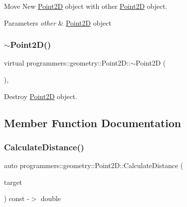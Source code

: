 Move New \hyperlink{classprogrammers_1_1geometry_1_1Point2D}{Point2D} object with other \hyperlink{classprogrammers_1_1geometry_1_1Point2D}{Point2D} object. 


\begin{DoxyParams}{Parameters}
{\em other} & \hyperlink{classprogrammers_1_1geometry_1_1Point2D}{Point2D} object \\
\hline
\end{DoxyParams}
\mbox{\label{classprogrammers_1_1geometry_1_1Point2D_a61f13d98978ddb65c4380657fb429cb3}} 
\subsubsection{\texorpdfstring{$\sim$\+Point2\+D()}{~Point2D()}}
{\footnotesize\ttfamily virtual programmers\+::geometry\+::\+Point2\+D\+::$\sim$\+Point2D (\begin{DoxyParamCaption}{ }\end{DoxyParamCaption})\hspace{0.3cm}{\ttfamily [virtual]}, {\ttfamily [default]}}



Destroy \hyperlink{classprogrammers_1_1geometry_1_1Point2D}{Point2D} object. 



\subsection{Member Function Documentation}
\mbox{\label{classprogrammers_1_1geometry_1_1Point2D_a724e8f68efe2a33069335a8401ecfc70}} 
\subsubsection{\texorpdfstring{Calculate\+Distance()}{CalculateDistance()}\hspace{0.1cm}{\footnotesize\ttfamily [1/2]}}
{\footnotesize\ttfamily auto programmers\+::geometry\+::\+Point2\+D\+::\+Calculate\+Distance (\begin{DoxyParamCaption}\item[{const \hyperlink{classprogrammers_1_1geometry_1_1Point2D}{Point2D} \&}]{target }\end{DoxyParamCaption}) const -\/$>$  double}



